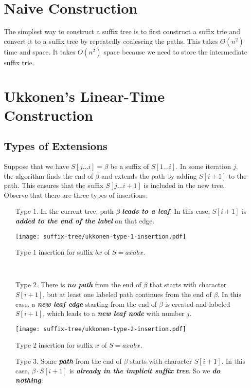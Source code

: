 \section{Naive Construction}

The simplest way to construct a suffix tree is to first construct a suffix trie and convert it to a suffix tree by repeatedly coalescing the paths. This takes $O(n^2)$ time and space. It takes $O(n^2)$ space because we need to store the intermediate suffix trie.

\section{Ukkonen's Linear-Time Construction}

\subsection{Types of Extensions}

Suppose that we have $S[j\ldots i] = \beta$ be a suffix of $S[1\ldots i]$. In some iteration $j$, the algorithm finds the end of $\beta$ and extends the path by adding $S[i+1]$ to the path. This ensures that the suffix $S[j\ldots i+1]$ is included in the new tree. Observe that there are three types of insertions:

\begin{enumerate}
    \item[Type 1.] In the current tree, path $\beta$ \textit{\textbf{leads to a leaf}}. In this case, $S[i+1]$ is \textit{\textbf{added to the end of the label}} on that edge.
    \begin{marginfigure}
        \centering
        \texttt{[image: suffix-tree/ukkonen-type-1-insertion.pdf]}
        \caption{Type 1 insertion for suffix $bx$ of $S=axabx$.}
        \hfill \\
    \end{marginfigure}

    \item[Type 2.] There is \textit{\textbf{no path}} from the end of $\beta$ that starts with character $S[i+1]$, but at least one labeled path continues from the end of $\beta$. In this case, a \textit{\textbf{new leaf edge}} starting from the end of $\beta$ is created and labeled $S[i+1]$, which leads to a \textit{\textbf{new leaf node}} with number $j$.
    \begin{marginfigure}
        \centering
        \texttt{[image: suffix-tree/ukkonen-type-2-insertion.pdf]}
        \caption{Type 2 insertion for suffix $x$ of $S=axabx$.}
    \end{marginfigure}

    \item[Type 3.] Some \textit{\textbf{path}} from the end of $\beta$ starts with character $S[i+1]$. In this case, $\beta \cdot S[i+1]$ is \textit{\textbf{already in the implicit suffix tree}}. So we \textit{\textbf{do nothing}}.
\end{enumerate}

